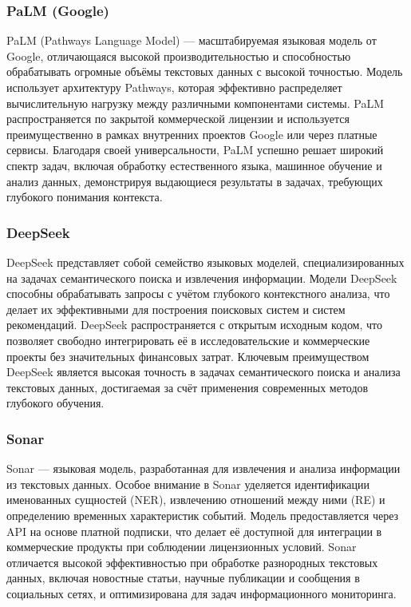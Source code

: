 \subsubsection{PaLM (Google)}

PaLM (Pathways Language Model) — масштабируемая языковая модель от Google, отличающаяся высокой производительностью и способностью обрабатывать огромные объёмы текстовых данных с высокой точностью. Модель использует архитектуру Pathways, которая эффективно распределяет вычислительную нагрузку между различными компонентами системы. PaLM распространяется по закрытой коммерческой лицензии и используется преимущественно в рамках внутренних проектов Google или через платные сервисы. Благодаря своей универсальности, PaLM успешно решает широкий спектр задач, включая обработку естественного языка, машинное обучение и анализ данных, демонстрируя выдающиеся результаты в задачах, требующих глубокого понимания контекста.

\subsubsection{DeepSeek}

DeepSeek представляет собой семейство языковых моделей, специализированных на задачах семантического поиска и извлечения информации. Модели DeepSeek способны обрабатывать запросы с учётом глубокого контекстного анализа, что делает их эффективными для построения поисковых систем и систем рекомендаций. DeepSeek распространяется с открытым исходным кодом, что позволяет свободно интегрировать её в исследовательские и коммерческие проекты без значительных финансовых затрат. Ключевым преимуществом DeepSeek является высокая точность в задачах семантического поиска и анализа текстовых данных, достигаемая за счёт применения современных методов глубокого обучения.

\subsubsection{Sonar}

Sonar — языковая модель, разработанная для извлечения и анализа информации из текстовых данных. Особое внимание в Sonar уделяется идентификации именованных сущностей (NER), извлечению отношений между ними (RE) и определению временных характеристик событий. Модель предоставляется через API на основе платной подписки, что делает её доступной для интеграции в коммерческие продукты при соблюдении лицензионных условий. Sonar отличается высокой эффективностью при обработке разнородных текстовых данных, включая новостные статьи, научные публикации и сообщения в социальных сетях, и оптимизирована для задач информационного мониторинга.

